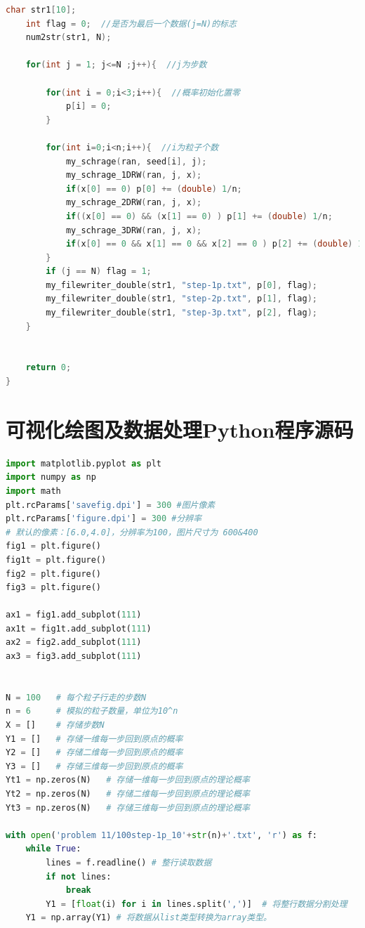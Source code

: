 \documentclass[a4paper,11pt]{article}
\begin{document}
\begin{appendices}
\begin{lstlisting}[language = C]
    char str1[10];
    int flag = 0;  //是否为最后一个数据(j=N)的标志
    num2str(str1, N);
    
    for(int j = 1; j<=N ;j++){  //j为步数
        
        for(int i = 0;i<3;i++){  //概率初始化置零
            p[i] = 0;
        }
        
        for(int i=0;i<n;i++){  //i为粒子个数
            my_schrage(ran, seed[i], j);
            my_schrage_1DRW(ran, j, x);
            if(x[0] == 0) p[0] += (double) 1/n;
            my_schrage_2DRW(ran, j, x);
            if((x[0] == 0) && (x[1] == 0) ) p[1] += (double) 1/n;
            my_schrage_3DRW(ran, j, x);
            if(x[0] == 0 && x[1] == 0 && x[2] == 0 ) p[2] += (double) 1/n;
        }
        if (j == N) flag = 1;
        my_filewriter_double(str1, "step-1p.txt", p[0], flag);
        my_filewriter_double(str1, "step-2p.txt", p[1], flag);
        my_filewriter_double(str1, "step-3p.txt", p[2], flag);
    }
    
        
    return 0;
}

\end{lstlisting}

\newpage

\section{可视化绘图及数据处理Python程序源码}

\begin{lstlisting}[language = python]
import matplotlib.pyplot as plt
import numpy as np
import math
plt.rcParams['savefig.dpi'] = 300 #图片像素
plt.rcParams['figure.dpi'] = 300 #分辨率
# 默认的像素：[6.0,4.0]，分辨率为100，图片尺寸为 600&400
fig1 = plt.figure()
fig1t = plt.figure()
fig2 = plt.figure()
fig3 = plt.figure()

ax1 = fig1.add_subplot(111)
ax1t = fig1t.add_subplot(111)
ax2 = fig2.add_subplot(111)
ax3 = fig3.add_subplot(111)


N = 100   # 每个粒子行走的步数N
n = 6     # 模拟的粒子数量，单位为10^n
X = []    # 存储步数N
Y1 = []   # 存储一维每一步回到原点的概率
Y2 = []   # 存储二维每一步回到原点的概率
Y3 = []   # 存储三维每一步回到原点的概率
Yt1 = np.zeros(N)   # 存储一维每一步回到原点的理论概率
Yt2 = np.zeros(N)   # 存储二维每一步回到原点的理论概率
Yt3 = np.zeros(N)   # 存储三维每一步回到原点的理论概率

with open('problem 11/100step-1p_10'+str(n)+'.txt', 'r') as f:
    while True:
        lines = f.readline() # 整行读取数据
        if not lines:
            break
        Y1 = [float(i) for i in lines.split(',')]  # 将整行数据分割处理
    Y1 = np.array(Y1) # 将数据从list类型转换为array类型。


\end{lstlisting}
\end{appendices}
\end{document}
